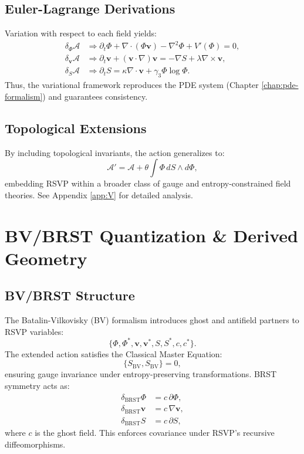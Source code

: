 \documentclass[12pt]{report}
\begin{document}
\section{Euler-Lagrange Derivations}
Variation with respect to each field yields:
\begin{align}
\delta_\Phi \mathcal{A} &\Rightarrow \partial_t \Phi + \nabla\cdot(\Phi \mathbf{v}) - \nabla^2 \Phi + V'(\Phi) = 0, \\
\delta_{\mathbf{v}} \mathcal{A} &\Rightarrow \partial_t \mathbf{v} + (\mathbf{v}\cdot\nabla)\mathbf{v} = -\nabla S + \lambda \nabla \times \mathbf{v}, \\
\delta_S \mathcal{A} &\Rightarrow \partial_t S = \kappa \nabla \cdot \mathbf{v} + \gamma_3 \Phi \log \Phi.
\end{align}
Thus, the variational framework reproduces the PDE system (Chapter \ref{chap:pde-formalism}) and guarantees consistency.

\section{Topological Extensions}
By including topological invariants, the action generalizes to:
\begin{equation}
\mathcal{A}' = \mathcal{A} + \theta \int \Phi \, dS \wedge d\Phi,
\end{equation}
embedding RSVP within a broader class of gauge and entropy-constrained field theories. See Appendix \ref{app:V} for detailed analysis.

\chapter{BV/BRST Quantization \& Derived Geometry}
\label{app:Q}
\section{BV/BRST Structure}
The Batalin-Vilkovisky (BV) formalism introduces ghost and antifield partners to RSVP variables:
\[
\{\Phi, \Phi^*, \mathbf{v}, \mathbf{v}^*, S, S^*, c, c^*\}.
\]
The extended action satisfies the Classical Master Equation:
\begin{equation}
\{ S_{\text{BV}}, S_{\text{BV}} \} = 0,
\end{equation}
ensuring gauge invariance under entropy-preserving transformations. BRST symmetry acts as:
\begin{align}
\delta_{\text{BRST}} \Phi &= c \, \partial \Phi, \\
\delta_{\text{BRST}} \mathbf{v} &= c \, \nabla \mathbf{v}, \\
\delta_{\text{BRST}} S &= c \, \partial S,
\end{align}
where \(c\) is the ghost field. This enforces covariance under RSVP’s recursive diffeomorphisms.
\end{document}
